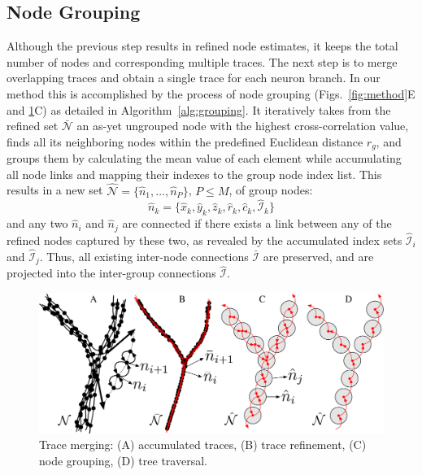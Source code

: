 \subsection{Node Grouping}
\label{subsec:node-grouping}
Although the previous step results in refined node estimates, it keeps the total number of nodes and corresponding multiple traces. The next step is to merge overlapping traces and obtain a single trace for each neuron branch. In our method this is accomplished by the process of node grouping (Figs.~\ref{fig:method}E and \ref{fig4}C) as detailed in Algorithm~\ref{alg:grouping}. It iteratively takes from the refined set $\bar{\mathcal{N}}$ an as-yet ungrouped node with the highest cross-correlation value, finds all its neighboring nodes within the predefined Euclidean distance $r_g$, and groups them by calculating the mean value of each element while accumulating all node links and mapping their indexes to the group node index list. This results in a new set $\hat{\mathcal{N}} = \lbrace \hat{n}_1,\dots,\hat{n}_P \rbrace$, $P \leq M$, of group nodes:
\begin{equation}
\label{eq:hat_n_k}
\hat{n}_k=\lbrace\hat{x}_k, \hat{y}_k, \hat{z}_k, \hat{r}_k, \hat{c}_k, \hat{\mathcal{I}}_k\rbrace
\end{equation}
and any two $\hat{n}_i$ and $\hat{n}_j$ are connected if there exists a link between any of the refined nodes captured by these two, as revealed by the accumulated index sets $\hat{\mathcal{I}}_i$ and $\hat{\mathcal{I}}_j$. Thus, all existing inter-node connections $\bar{\mathcal{I}}$ are preserved, and are projected into the inter-group connections $\hat{\mathcal{I}}$.
\begin{figure}
	\centering
	\includegraphics[width=0.7\columnwidth]{fig4}
	\caption{Trace merging: (A) accumulated traces, (B) trace refinement, (C) node grouping, (D) tree traversal.}
	\label{fig4}
\end{figure}
